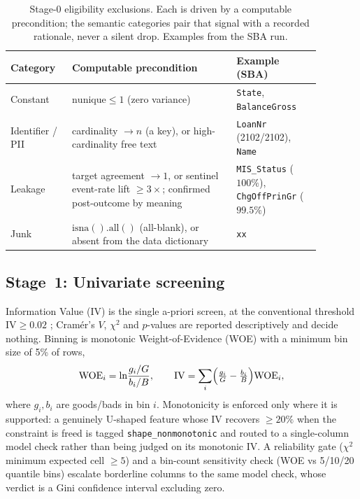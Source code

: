 \documentclass[9pt,journal]{IEEEtai}
\begin{document}
\begin{table}[!t]
\centering
\caption{Stage-0 eligibility exclusions. Each is driven by a computable precondition; the
semantic categories pair that signal with a recorded rationale, never a silent drop. Examples
from the SBA run.}
\label{tab:g0excl}
\footnotesize
\begin{tabular}{@{}p{0.17\linewidth}p{0.47\linewidth}p{0.24\linewidth}@{}}
\toprule
Category & Computable precondition & Example (SBA) \\
\midrule
Constant & $\mathrm{nunique}\le1$ (zero variance) & \texttt{State}, \texttt{BalanceGross} \\
Identifier / PII & cardinality $\to n$ (a key), or high-cardinality free text & \texttt{LoanNr} (2102/2102), \texttt{Name} \\
Leakage & target agreement $\to 1$, or sentinel event-rate lift $\ge 3\times$; confirmed post-outcome by meaning & \texttt{MIS\_Status} ($100\%$), \texttt{ChgOffPrinGr} ($99.5\%$) \\
Junk & $\mathrm{isna().all()}$ (all-blank), or absent from the data dictionary & \texttt{xx} \\
\bottomrule
\end{tabular}
\end{table}

\subsection{Stage~1: Univariate screening}
Information Value (IV) is the single a-priori screen, at the conventional
threshold $\mathrm{IV}\ge0.02$ \cite{siddiqi2006}; Cram\'er's $V$, $\chi^2$ and $p$-values are
reported descriptively and decide nothing. Binning is monotonic Weight-of-Evidence (WOE) with
a minimum bin size of 5\% of rows,
\begin{equation}
\mathrm{WOE}_i=\ln\!\frac{g_i/G}{b_i/B},\qquad
\mathrm{IV}=\sum_i\Bigl(\tfrac{g_i}{G}-\tfrac{b_i}{B}\Bigr)\mathrm{WOE}_i,
\label{eq:woe}
\end{equation}
where $g_i,b_i$ are goods/bads in bin $i$. Monotonicity is enforced only where it is supported:
a genuinely U-shaped feature whose IV recovers $\ge20\%$ when the constraint is freed is tagged
\texttt{shape\_nonmonotonic} and routed to a single-column model check rather than being judged
on its monotonic IV. A reliability gate ($\chi^2$ minimum expected cell $\ge5$) and a
bin-count sensitivity check (WOE vs 5/10/20 quantile bins) escalate borderline columns to the
same model check, whose verdict is a Gini confidence interval excluding zero.
\end{document}

